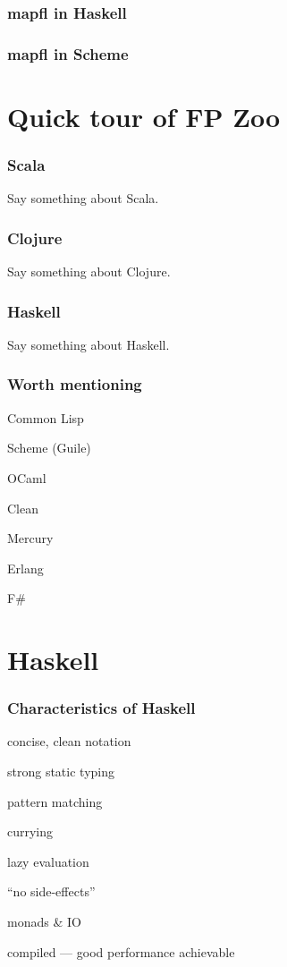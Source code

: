 \begin{frame}
\frametitle{mapfl in Haskell}

\end{frame}

\begin{frame}
\frametitle{mapfl in Scheme}

\end{frame}

\section{Quick tour of FP Zoo}

\begin{frame}
\frametitle{Scala}
Say something about Scala.
\end{frame}

\begin{frame}
\frametitle{Clojure}
Say something about Clojure.
\end{frame}

\begin{frame}
\frametitle{Haskell}
Say something about Haskell.
\end{frame}

\begin{frame}
\frametitle{Worth mentioning}
\bi
\item Common Lisp
\item Scheme (Guile)
\item OCaml
\item Clean
\item Mercury
\item Erlang
\item F\#
\ei
\end{frame}

\section{Haskell}

\begin{frame}
\frametitle{Characteristics of Haskell}
\bi
\item concise, clean notation
\item strong static typing
\item pattern matching
\item currying
\item lazy evaluation
\item ``no side-effects''
\item monads \& IO
\item compiled --- good performance achievable
\ei
\end{frame}

